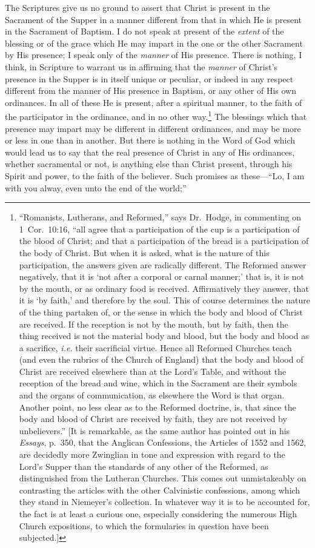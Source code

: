 \documentclass[
]{book}
\begin{document}
The Scriptures give us no ground to assert that Christ is present in the Sacrament of the Supper in a manner different from that in which He is present in the Sacrament of Baptism. I do not speak at present of the \emph{extent} of the blessing or of the grace which He may impart in the one or the other Sacrament by His presence; I speak only of the \emph{manner} of His presence. There is nothing, I think, in Scripture to warrant us in affirming that the \emph{manner} of Christ's presence in the Supper is in itself unique or peculiar, or indeed in any respect different from the manner of His presence in Baptism, or any other of His own ordinances. In all of these He is present, after a spiritual manner, to the faith of the participator in the ordinance, and in no other way.\footnote{``Romanists, Lutherans, and Reformed,'' says Dr.~Hodge, in commenting on 1~Cor.~10:16, ``all agree that a participation of the cup is a participation of the blood of Christ; and that a participation of the bread is a participation of the body of Christ. But when it is asked, what is the nature of this participation, the answers given are radically different. The Reformed answer negatively, that it is `not after a corporal or carnal manner;' that is, it is not by the mouth, or as ordinary food is received. Affirmatively they answer, that it is `by faith,' and therefore by the soul. This of course determines the nature of the thing partaken of, or the sense in which the body and blood of Christ are received. If the reception is not by the mouth, but by faith, then the thing received is not the material body and blood, but the body and blood as a sacrifice, \emph{i.e.} their sacrificial virtue. Hence all Reformed Churches teach (and even the rubrics of the Church of England) that the body and blood of Christ are received elsewhere than at the Lord's Table, and without the reception of the bread and wine, which in the Sacrament are their symbols and the organs of communication, as elsewhere the Word is that organ. Another point, no less clear as to the Reformed doctrine, is, that since the body and blood of Christ are received by faith, they are not received by unbelievers.'' {[}It is remarkable, as the same author has pointed out in his \emph{Essays}, p.~350, that the Anglican Confessions, the Articles of 1552 and 1562, are decidedly more Zwinglian in tone and expression with regard to the Lord's Supper than the standards of any other of the Reformed, as distinguished from the Lutheran Churches. This comes out unmistakeably on contrasting the articles with the other Calvinistic confessions, among which they stand in Niemeyer's collection. In whatever way it is to be accounted for, the fact is at least a curious one, especially considering the numerous High Church expositions, to which the formularies in question have been subjected.{]}} The blessings which that presence may impart may be different in different ordinances, and may be more or less in one than in another. But there is nothing in the Word of God which would lead us to say that the real presence of Christ in any of His ordinances, whether sacramental or not, is anything else than Christ present, through his Spirit and power, to the faith of the believer. Such promises as these---``Lo, I am with you alway, even unto the end of the world;'' 
\end{document}
